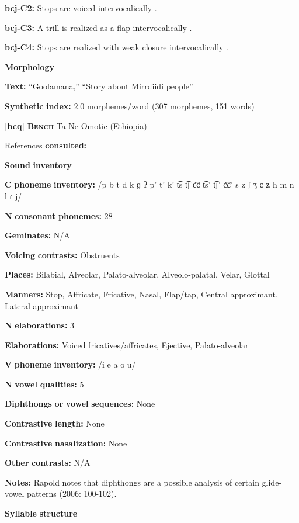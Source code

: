 \textbf{bcj-C2:}  Stops are voiced intervocalically \citep[76]{Bowern2012}.

\textbf{bcj-C3:} A trill is realized as a flap intervocalically \citep[81]{Bowern2012}.

\textbf{bcj-C4:} Stops are realized with weak closure intervocalically \citep[78]{Bowern2012}.

\textbf{Morphology}

\textbf{Text:} “Goolamana,” “Story about Mirrdiidi people” \citep[704-710]{Bowern2012}

\textbf{Synthetic} \textbf{index:} 2.0 morphemes/word (307 morphemes, 151 words)

\textbf{[bcq]}   \textbf{\textsc{Bench}  }  Ta-Ne-Omotic (Ethiopia)

References \textbf{consulted:} \citet{Rapold2006}

\textbf{Sound} \textbf{inventory}

\textbf{C} \textbf{phoneme} \textbf{inventory:} /p b t d k ɡ ʔ p’ t’ k’ t͡s t͡ʃ c͡ɕ t͡s’ t͡ʃ’ c͡ɕ’ s z ʃ ʒ ɕ ʑ h m n l ɾ j/

\textbf{N} \textbf{consonant} \textbf{phonemes:} 28

\textbf{Geminates:} N/A

\textbf{Voicing} \textbf{contrasts:} Obstruents

\textbf{Places:} Bilabial, Alveolar, Palato-alveolar, Alveolo-palatal, Velar, Glottal

\textbf{Manners:} Stop, Affricate, Fricative, Nasal, Flap/tap, Central approximant, Lateral approximant

\textbf{N} \textbf{elaborations:} 3

\textbf{Elaborations:} Voiced fricatives/affricates, Ejective, Palato-alveolar

\textbf{V} \textbf{phoneme} \textbf{inventory:} /i e a o u/

\textbf{N} \textbf{vowel} \textbf{qualities:} 5

\textbf{Diphthongs} \textbf{or} \textbf{vowel} \textbf{sequences:} None

\textbf{Contrastive} \textbf{length:} None

\textbf{Contrastive} \textbf{nasalization:} None

\textbf{Other} \textbf{contrasts:} N/A

\textbf{Notes:} Rapold notes that diphthongs are a possible analysis of certain glide-vowel patterns (2006: 100-102).

\textbf{Syllable} \textbf{structure}


